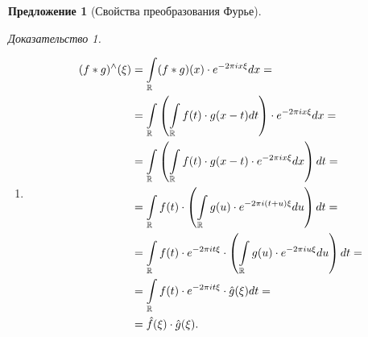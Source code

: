 \documentclass[a5paper, 10pt]{article}
\theoremstyle{definition}
\theoremstyle{plain}
\newtheorem*{Prop}{Предложение}
\theoremstyle{remark}
\newtheorem*{Proof}{Доказательство}
\begin{document}
\begin{Prop}[Свойства преобразования Фурье]
\begin{Proof}
\begin{enumerate}
            Воспользуемся эквивалентным определением принадлежности пространству Шварца:
            \[
                \forall\, \alpha,\beta \in \Z_+ \quad \sup\limits_\xi \hm{\hr{\xi^\beta \hat{f}(\xi)}^{(\alpha)}} < \infty.
            \] 

            Из 9-ого свойства:
            \[
                \xi^\beta \hat{f}(\xi) = \frac{1}{(2\pi i)^\beta} (f^{(\beta)})^\wedge (\xi).
            \] 
            Взяв производную с двух сторон и применив 10-ое свойство, получаем
            \[
                \hr{\xi^\beta \hat{f}(\xi)}^{(\alpha)} = \frac{1}{(2\pi i)^\beta} \hr{\hr{-2\pi i \star}^{\alpha} f^{(\beta)}}^\wedge (\xi) = \frac{(-2\pi i)^\alpha}{(2\pi i)^\beta} \hr{\star^\alpha f^{(\beta)}}^\wedge (\xi).
            \] 
            Тогда, переходя к нормам, по 3-ему свойству
            \[
                \|\hr{\xi^\beta \hat{f}(\xi)}^{(\alpha)}\| \leqslant  \frac{(2\pi )^\alpha}{(2\pi )^\beta} \int\limits_\R \hm{x^\alpha f^{(\beta)}(x)} dx.
            \] 
            Так как сама $f^{(\beta)}$ лежит в пространстве Шварца, то по одному из определений $f^{(\beta)}(x) \leqslant \frac{C_{N,\alpha}}{(1+|x|)^N}$. Возьмем, например, $N=\alpha+2$.
            \[
                \frac{(2\pi i)^\alpha}{(2\pi i)^\beta} \int\limits_\R \hm{x^\alpha f^{(\beta)}(x)} dx \leqslant \frac{(2\pi)^\alpha}{(2\pi)^\beta} \int\limits_\R \frac{|x|^\alpha C}{(1+|x|)^{\alpha+2}} dx < \infty.
            \] 
        \item \[
                \begin{split}
                    (f*g)^\wedge (\xi) &= \int\limits_{\mathbb{R}} (f*g)(x) \cdot e^{-2\pi i x\xi}dx = \\
                                       &= \int\limits_{\mathbb{R}} \left(\int\limits_{\mathbb{R}} f(t) \cdot g(x-t) dt\right) \cdot e^{-2\pi i x\xi}dx = \\
                                       &= \int\limits_{\mathbb{R}} \left(\int\limits_{\mathbb{R}} f(t) \cdot g(x-t)\cdot e^{-2\pi i x\xi}dx\right)dt = \\
                                       &= \int\limits_{\mathbb{R}} f(t)\cdot \left(\int\limits_{\mathbb{R}} g(u)\cdot e^{-2\pi i (t+u)\xi}du\right)dt =\\
                                       &= \int\limits_{\mathbb{R}} f(t) \cdot e^{-2\pi i t \xi} \cdot \left(\int\limits_{\mathbb{R}} g(u)\cdot e^{-2\pi i u\xi}du\right) dt = \\
                                       &= \int\limits_{\mathbb{R}} f(t) \cdot e^{-2\pi i t \xi} \cdot \hat{g}(\xi) dt =\\
                                       &= \hat{f}(\xi) \cdot \hat{g}(\xi).
                \end{split}
        \]  
            \end{enumerate}
        \end{Proof}
    \end{Prop}
    
\end{document}
